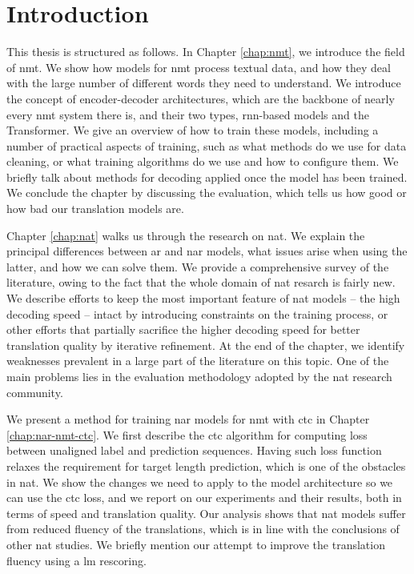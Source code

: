 \chapter{Introduction}
\label{chap:intro}


This thesis is structured as follows.
%
In Chapter \ref{chap:nmt}, we introduce the field of \ac{nmt}. We show how
models for \ac{nmt} process textual data, and how they deal with the large
number of different words they need to understand. We introduce the concept of
encoder-decoder architectures, which are the backbone of nearly every \ac{nmt}
system there is, and their two types, \acs{rnn}-based models and the
Transformer. We give an overview of how to train these models, including a
number of practical aspects of training, such as what methods do we use for
data cleaning, or what training algorithms do we use and how to configure
them. We briefly talk about methods for decoding applied once the model has
been trained. We conclude the chapter by discussing the evaluation, which tells
us how good or how bad our translation models are.

Chapter \ref{chap:nat} walks us through the research on \ac{nat}. We explain
the principal differences between \acl{ar} and \acl{nar} models, what issues
arise when using the latter, and how we can solve them. We provide a
comprehensive survey of the literature, owing to the fact that the whole domain
of \ac{nat} resarch is fairly new. We describe efforts to keep the most
important feature of \ac{nat} models -- the high decoding speed -- intact by
introducing constraints on the training process, or other efforts that
partially sacrifice the higher decoding speed for better translation quality by
iterative refinement. At the end of the chapter, we identify weaknesses
prevalent in a large part of the literature on this topic. One of the main
problems lies in the evaluation methodology adopted by the \ac{nat} research
community.

We present a method for training \acl{nar} models for \ac{nmt} with \ac{ctc} in
Chapter \ref{chap:nar-nmt-ctc}. We first describe the \ac{ctc} algorithm for
computing loss between unaligned label and prediction sequences. Having such
loss function relaxes the requirement for target length prediction, which is
one of the obstacles in \ac{nat}. We show the changes we need to apply to the
model architecture so we can use the \ac{ctc} loss, and we report on our
experiments and their results, both in terms of speed and translation quality.
Our analysis shows that \ac{nat} models suffer from reduced fluency of the
translations, which is in line with the conclusions of other \ac{nat} studies.
We briefly mention our attempt to improve the translation fluency using a
\acl{lm} rescoring.

